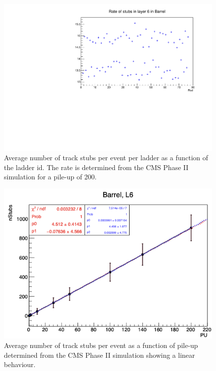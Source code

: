 \begin{figure}[hbtp]
\centering
\includegraphics[width=.6\linewidth]{tex/Part2/fig/OT/OT-Rates.pdf}
\caption{
  Average number of track stubs per event per ladder as a function of the ladder id. The rate is determined from the CMS Phase II simulation for a pile-up of 200.
}
\label{fig:OT_rates}
\end{figure}


\begin{figure}[hbtp]
\centering
\includegraphics[width=.6\linewidth]{tex/Part2/fig/OT/OT-linearity.png}
\caption{
 Average number of track stubs per event as a function of pile-up determined from the CMS Phase II simulation showing a linear behaviour.
} 
\label{fig:OT_linearity}
\end{figure}
